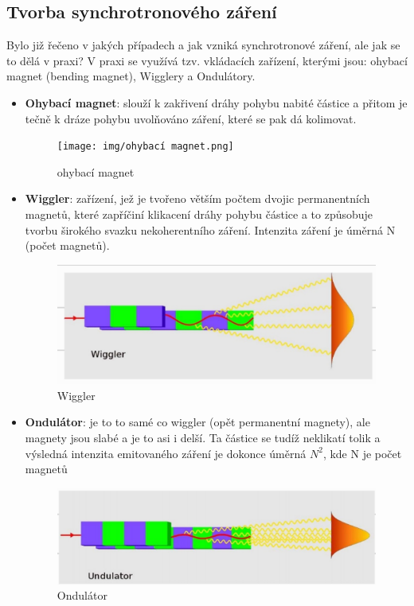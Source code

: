 \subsection{Tvorba synchrotronového záření}

Bylo již řečeno v jakých případech a jak vzniká synchrotronové záření, ale jak se to dělá v praxi? V praxi se využívá tzv. vkládacích zařízení, kterými jsou: ohybací magnet (bending magnet), Wigglery a Ondulátory.

\begin{itemize}
    \item \textbf{Ohybací magnet}: slouží k zakřivení dráhy pohybu nabité částice a přitom je tečně k dráze pohybu uvolňováno záření, které se pak dá kolimovat.

    \begin{figure}[H]
        \centering
        \texttt{[image: img/ohybací magnet.png]}
        \caption{ohybací magnet}
    \end{figure}

    \item \textbf{Wiggler}: zařízení, jež je tvořeno větším počtem dvojic permanentních magnetů, které zapříčiní klikacení dráhy pohybu částice a to způsobuje tvorbu širokého svazku nekoherentního záření. Intenzita záření je úměrná N (počet magnetů).

    \begin{figure}[H]
        \centering
        \includegraphics[width=0.5\linewidth]{img/Wiggler.png}
        \caption{Wiggler}
    \end{figure}
        
    \item \textbf{Ondulátor}: je to to samé co wiggler (opět permanentní magnety), ale magnety jsou slabé a je to asi i delší. Ta částice se tudíž neklikatí tolik a výsledná intenzita emitovaného záření je dokonce úměrná $N^2$, kde N je počet magnetů

    \begin{figure}[H]
        \centering
        \includegraphics[width=0.5\linewidth]{img/Ondulátor.png}
        \caption{Ondulátor}
    \end{figure}
\end{itemize}

